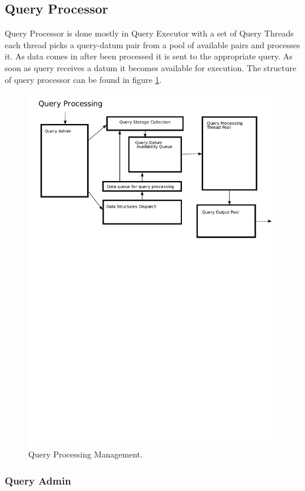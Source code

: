 \documentclass[11pt]{article}
\begin{document}
\subsection{Query Processor}

Query Processor is done mostly in Query Executor with a set of Query Threads each thread picks a query-datum pair from a pool of available pairs and processes it. As data comes in after been processed it is sent to the appropriate query. As soon as query receives a datum it becomes available for execution. The structure of query processor can be found in figure \ref{QueryProcessingPic}.

\begin{figure}
  \includegraphics[width=5.00in]{../figures/QueryProcessing.pdf}
  \caption{Query Processing Management.}
  \label{QueryProcessingPic}
\end{figure}

\subsubsection{Query Admin}
\end{document}
